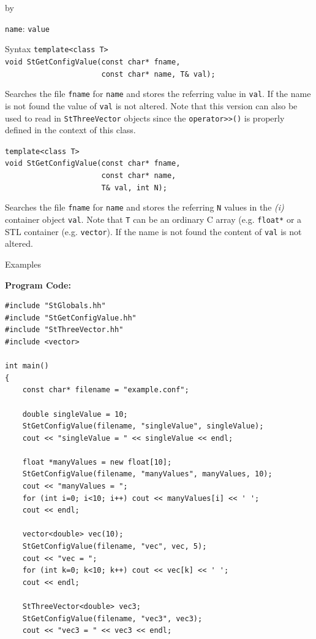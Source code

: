 \documentclass[twoside]{article}
\newcommand{\comp}[1]{\texttt{#1}}%
\newcommand{\entrylabel}[1]{\mbox{\textbf{{#1}}}\hfil}%
\newenvironment{entry}
{\begin{list}{}%
    {\renewcommand{\makelabel}{\entrylabel}%
     \setlength{\labelwidth}{90pt}%
     \setlength{\leftmargin}{\labelwidth}
     \advance\leftmargin by \labelsep%
      }%
    }%
  {\end{list}}
\newcommand{\Entrylabel}[1]%
{\raisebox{0pt}[1ex][0pt]{\makebox[\labelwidth][l]%
    {\parbox[t]{\labelwidth}{\hspace{0pt}\textbf{{#1}}}}}}
\newenvironment{Entry}%
{\renewcommand{\entrylabel}{\Entrylabel}\begin{entry}}%
  {\end{entry}}
\begin{document}
\begin{description}
\begin{Entry}
    \comp{name}: \comp{value}
    
\item[Syntax]
    \verb+template<class T>+\\
    \verb+void StGetConfigValue(const char* fname,+\\
    \verb+                      const char* name, T& val);+
    
    Searches the file \comp{fname} for \comp{name} and stores
    the referring value in \comp{val}. If the name is not found the value of
    \comp{val} is not altered. Note that this version can also be used to read in
    \comp{StThreeVector} objects since the \verb+operator>>()+ is properly defined in the
    context of this class.
        
    \verb+template<class T>+\\
    \verb+void StGetConfigValue(const char* fname,+\\
    \verb+                      const char* name,+\\
    \verb+                      T& val, int N);+
    
    Searches the file \comp{fname} for \comp{name} and stores
    the referring \comp{N} values in the {\em (i)} container object \comp{val}.
    Note that \comp{T} can be an ordinary C array (e.g. \comp{float*} or a
    STL container
    (e.g. \comp{vector}).
    If the name is not found the content of \comp{val} is not altered.

\item[Examples]
{\footnotesize
{\bf Program Code:}  
\begin{verbatim}
#include "StGlobals.hh"
#include "StGetConfigValue.hh"
#include "StThreeVector.hh"
#include <vector>

int main()
{
    const char* filename = "example.conf";

    double singleValue = 10;
    StGetConfigValue(filename, "singleValue", singleValue);
    cout << "singleValue = " << singleValue << endl;

    float *manyValues = new float[10];
    StGetConfigValue(filename, "manyValues", manyValues, 10);
    cout << "manyValues = ";
    for (int i=0; i<10; i++) cout << manyValues[i] << ' ';
    cout << endl;

    vector<double> vec(10);
    StGetConfigValue(filename, "vec", vec, 5);
    cout << "vec = ";
    for (int k=0; k<10; k++) cout << vec[k] << ' ';
    cout << endl;

    StThreeVector<double> vec3;
    StGetConfigValue(filename, "vec3", vec3);
    cout << "vec3 = " << vec3 << endl;
    

\end{verbatim}}
\end{Entry}
\end{description}
\end{document}

